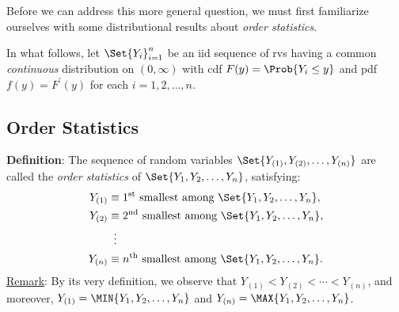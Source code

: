 Before we can address this more general question, we must first familiarize ourselves with
some distributional results about \emph{order statistics}.

In what follows, let $ \Set{Y_i}_{i=1}^n $ be an iid sequence of rvs having a common \emph{continuous} distribution
on $ (0,\infty) $ with cdf $ F(y)=\Prob{Y_i\le y} $ and pdf $ f(y)=F^\prime(y) $ for each $ i=1,2,\ldots,n $.

\subsection*{Order Statistics}
\begin{Regular}
    \textbf{Definition}: The sequence of random variables $ \Set{Y_{(1)},Y_{(2)},\ldots,Y_{(n)}} $ are called the \emph{order statistics}
    of $ \Set{Y_1,Y_2,\ldots,Y_n} $, satisfying:
    \begin{align*}
        Y_{(1)} & \equiv \text{$1\textsuperscript{st}$ smallest among $ \Set{Y_1,Y_2,\ldots,Y_n} $}, \\
        Y_{(2)} & \equiv \text{$2\textsuperscript{nd}$ smallest among $ \Set{Y_1,Y_2,\ldots,Y_n} $}, \\
                & \vdotswithin{\equiv}                                                               \\
        Y_{(n)} & \equiv \text{$n\textsuperscript{th}$ smallest among $ \Set{Y_1,Y_2,\ldots,Y_n} $}.
    \end{align*}
    \tcblower{}
    \underline{Remark}: By its very definition, we observe that $ Y_{(1)}<Y_{(2)}<\cdots<Y_{(n)} $,
    and moreover, $ Y_{(1)}=\MIN{Y_1,Y_2,\ldots,Y_n} $ and $ Y_{(n)}=\MAX{Y_1,Y_2,\ldots,Y_n} $.
\end{Regular}
